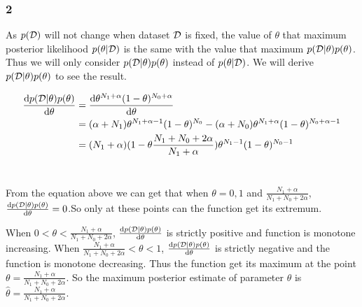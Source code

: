 \documentclass[10pt]{article}
\begin{document}
		
	
	
	
	\subsubsection{2}
	As $p(\cal D)$ will not change when dataset $\cal D$ is fixed, the value of $\theta$ that maximum posterior likelihood $p(\theta|\cal D)$ is the same with the value that maximum $p({\cal D} |\theta) p(\theta)$. Thus we will only consider $p({\cal D} |\theta)p(\theta)$ instead of $p(\theta|{\cal D})$. We will derive $p({\cal D} |\theta)p(\theta)$ to see the result.
	
	\begin{equation}
	\begin{aligned}
	\frac{\mathrm{d}p({\cal D} | \theta)p(\theta)}{\mathrm{d}\theta}&=\frac{\mathrm{d}\theta^{N_1+\alpha}(1-\theta)^{N_0+\alpha}}{\mathrm{d}\theta}\\
	&=(\alpha+ N_1) \theta^{N_1+\alpha-1}(1-\theta)^{N_0}-(\alpha+ N_0) \theta^{N_1+\alpha} (1-\theta)^{N_0+\alpha-1} \\
	&=(N_1+\alpha) (1-\theta \frac{N_1+N_0+2 \alpha}{N_1+\alpha})\theta^{N_1-1}(1-\theta)^{N_0-1}
	\end{aligned}
	\end{equation}\\
	\par
	From the equation above we can get that when $\theta=0, 1$ and  $\frac{N_1+\alpha}{N_1+N_0+2 \alpha}$, $\frac{\mathrm{d}p({\cal D} | \theta)p(\theta)}{\mathrm{d}\theta}=0$.So only at these points can the function get its extremum. 
	
	\par
	
	When $0<\theta<\frac{N_1+\alpha}{N_1+N_0+2 \alpha}$, $\frac{\mathrm{d}p({\cal D} | \theta)p(\theta)}{\mathrm{d}\theta}$ is strictly positive and function is monotone increasing. When $\frac{N_1+\alpha}{N_1+N_0+2 \alpha}<\theta<1$, $\frac{\mathrm{d}p({\cal D} | \theta)p(\theta)}{\mathrm{d}\theta}$ is strictly negative and the function is monotone decreasing. Thus the function get its maximum at the point $\theta=\frac{N_1+\alpha}{N_1+N_0+2 \alpha}$. So the maximum posterior estimate of parameter $\theta$ is $\hat{\theta}=\frac{N_1+\alpha}{N_1+N_0+2 \alpha}$.		
		
			
\end{document}
